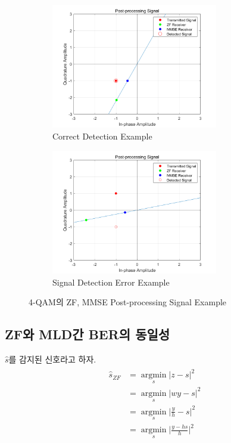 \documentclass{article}
\providecommand{\abs}[1]{\lvert#1\rvert}
\begin{document}
\begin{figure}[H]
	\centering
	\begin{subfigure}{0.5\textwidth}
		\centerline{\includegraphics[width=0.8\textwidth]{4qam_correct.png}}
		\caption{Correct Detection Example}
	\end{subfigure}%
	\begin{subfigure}{0.5\textwidth}
		\centerline{\includegraphics[width=0.8\textwidth]{4qam_error.png}}
		\caption{Signal Detection Error Example}
	\end{subfigure}
	\caption{4-QAM의 ZF, MMSE Post-processing Signal Example}
\end{figure}

\subsection{ZF와 MLD간 BER의 동일성}
$\hat{s}$를 감지된 신호라고 하자.
\begin{gather}
	\begin{split}
	\hat{s}_{ZF}&=\operatorname*{argmin}_s \abs{z-s}^2\\
	&=\operatorname*{argmin}_s \abs{wy-s}^2\\
	&=\operatorname*{argmin}_s \abs{\frac{y}{h}-s}^2\\
	&=\operatorname*{argmin}_s \abs{\frac{y-hs}{h}}^2
	\end{split}
\end{gather}
\end{document}
